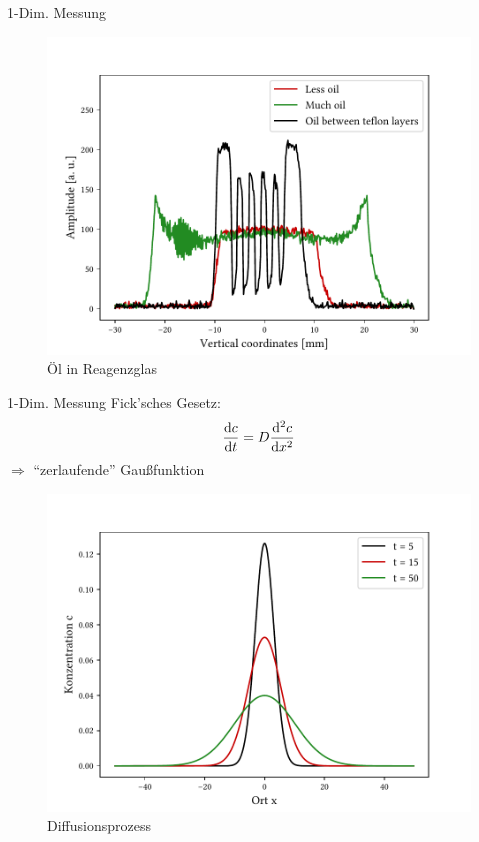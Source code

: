 \begin{frame}{1-Dim. Messung}
	\begin{figure} %
	\centering
	\includegraphics[scale=.55]{..//figures//f61_abb_8.pdf}
	\caption{Öl in Reagenzglas}
	\end{figure}
\end{frame}

\begin{frame}{1-Dim. Messung}
Fick'sches Gesetz: %
	\begin{align*}
	\dv{c}{t}=D\dv[2]{c}{x}
	\end{align*}
	$\Rightarrow$ \enquote{zerlaufende} Gaußfunktion
	\begin{figure}
	\centering
	\includegraphics[scale=.4]{..//figures//gaus.pdf}
	\caption{Diffusionsprozess}
	\end{figure}
\end{frame}

